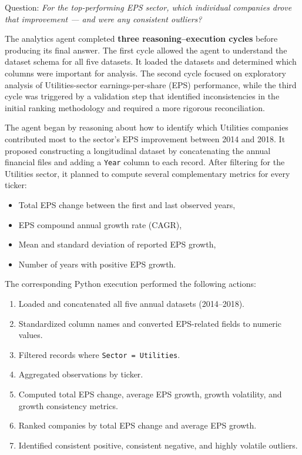 \vspace{20pt}

Question: \textit{For the top-performing EPS sector, which individual companies drove that improvement — and were any consistent outliers?}

\vspace{20pt}

The analytics agent completed \textbf{three reasoning--execution cycles} before producing its final answer. The first cycle allowed the agent to understand the dataset schema for all five datasets. It loaded the datasets and determined which columns were important for analysis. The second cycle focused on exploratory analysis of Utilities-sector earnings-per-share (EPS) performance, while the third cycle was triggered by a validation step that identified inconsistencies in the initial ranking methodology and required a more rigorous reconciliation.


The agent began by reasoning about how to identify which Utilities companies contributed most to the sector's EPS improvement between 2014 and 2018. It proposed constructing a longitudinal dataset by concatenating the annual financial files and adding a \texttt{Year} column to each record. After filtering for the Utilities sector, it planned to compute several complementary metrics for every ticker:

\begin{itemize}
  \item Total EPS change between the first and last observed years,
  \item EPS compound annual growth rate (CAGR),
  \item Mean and standard deviation of reported EPS growth,
  \item Number of years with positive EPS growth.
\end{itemize}

The corresponding Python execution performed the following actions:

\begin{enumerate}
  \item Loaded and concatenated all five annual datasets (2014--2018).
  \item Standardized column names and converted EPS-related fields to numeric values.
  \item Filtered records where \texttt{Sector = Utilities}.
  \item Aggregated observations by ticker.
  \item Computed total EPS change, average EPS growth, growth volatility, and growth consistency metrics.
  \item Ranked companies by total EPS change and average EPS growth.
  \item Identified consistent positive, consistent negative, and highly volatile outliers.
\end{enumerate}

